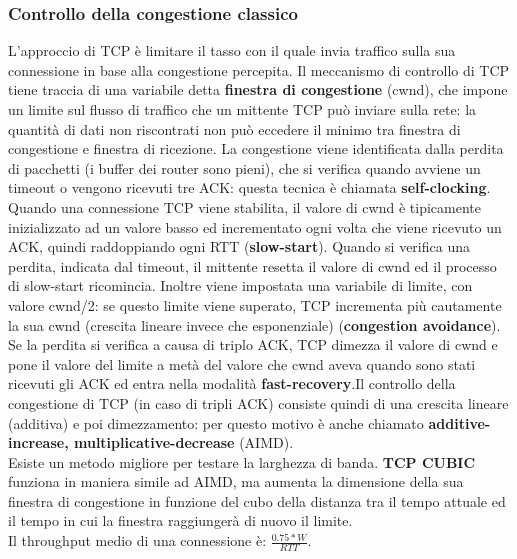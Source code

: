 \documentclass[11pt]{article}
\begin{document}
\subsubsection{Controllo della congestione classico}
L'approccio di TCP è limitare il tasso con il quale invia traffico sulla sua connessione in base alla congestione percepita. 
Il meccanismo di controllo di TCP tiene traccia di una variabile detta \textbf{finestra di congestione} (cwnd), che impone 
un limite sul flusso di traffico che un mittente TCP può inviare sulla rete: la quantità di dati non riscontrati non può 
eccedere il minimo tra finestra di congestione e finestra di ricezione. La congestione viene identificata dalla perdita di 
pacchetti (i buffer dei router sono pieni), che si verifica quando avviene un timeout o vengono ricevuti tre ACK: questa 
tecnica è chiamata \textbf{self-clocking}.\\
Quando una connessione TCP viene stabilita, il valore di cwnd è tipicamente inizializzato ad un valore basso ed incrementato 
ogni volta che viene ricevuto un ACK, quindi raddoppiando ogni RTT (\textbf{slow-start}). Quando si verifica una perdita, 
indicata dal timeout, il mittente resetta il valore di cwnd ed il processo di slow-start ricomincia. Inoltre viene impostata
una variabile di limite, con valore cwnd/2: se questo limite viene superato, TCP incrementa più cautamente la sua cwnd (crescita 
lineare invece che esponenziale) (\textbf{congestion avoidance}). Se la perdita si verifica a causa di triplo ACK, TCP 
dimezza il valore di cwnd e pone il valore del limite a metà del valore che cwnd aveva quando sono stati ricevuti gli ACK 
ed entra nella modalità \textbf{fast-recovery}.Il controllo della congestione di TCP (in caso di tripli ACK) consiste 
quindi di una crescita lineare (additiva) e poi dimezzamento: per questo motivo è anche chiamato 
\textbf{additive-increase, multiplicative-decrease} (AIMD).\\
Esiste un metodo migliore per testare la larghezza di banda. \textbf{TCP CUBIC} funziona in maniera simile ad AIMD, ma 
aumenta la dimensione della sua finestra di congestione in funzione del cubo della distanza tra il tempo attuale ed il tempo 
in cui la finestra raggiungerà di nuovo il limite.\\
Il throughput medio di una connessione è: $\frac{0.75*W}{RTT}$.
\end{document}
